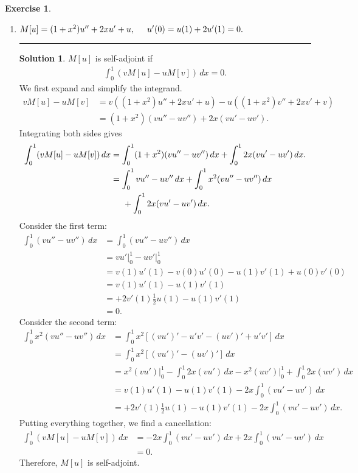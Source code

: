 \documentclass{article}
\theoremstyle{definition}
\newtheorem*{exer*}{Exercise}
\newtheorem*{sln*}{Solution}
\begin{document}
\begin{exer*}
\begin{enumerate}
		
		\item $M[u] = (1+x^2)u'' + 2xu' + u,\hspace{0.5cm} u'(0) = u(1) + 2u'(1) = 0.$\\
			\noindent\rule{\textwidth}{0.5pt}
		\begin{sln*}
		$M[u]$ is self-adjoint if
		\begin{align*}
		\int^1_0 (vM[u] - uM[v])\,dx = 0.
		\end{align*}
		We first expand and simplify the integrand.
		\begin{align*}
		vM[u] - uM[v] &= v((1+x^2)u'' + 2xu' + u) - u((1+x^2)v'' + 2xv' + v)\\
		&= (1+x^2)(vu'' - uv'') + 2x(vu' - uv').
		\end{align*} 
		Integrating both sides gives
		\begin{align*}
		\int^1_0 (vM[u] - uM[v])\,dx &= \int^1_0 (1+x^2)(vu'' - uv'')\,dx + \int^1_0 2x(vu' - uv')\,dx.\\
		&=\int^1_0 vu'' - uv''\,dx + \int^1_0 x^2(vu'' - uv'')\,dx\\
		&\hspace{0.5cm} + \int^1_0 2x(vu' - uv')\,dx.
		\end{align*}
		Consider the first term:
		\begin{align*}
		\int^1_0 (vu'' - uv'')\,dx &= \int^1_0 (vu'' - uv'')\,dx\\
		&= vu'\bigg\vert^1_0 - uv'\bigg\vert^1_0\\
		&= v(1)u'(1) - v(0)u'(0) - u(1)v'(1) + u(0)v'(0)\\
		&= v(1)u'(1) - u(1)v'(1)\\
		&= +2v'(1)\frac{1}{2}u(1) - u(1)v'(1)\\
		&= 0.
		\end{align*}
		Consider the second term:
		\begin{align*}
		\int^1_0 x^2(vu'' - uv'')\,dx &= \int^1_0 x^2 \left[ (vu')' - u'v' - (uv')' + u'v'  \right]\,dx\\
		&= \int^1_0 x^2\left[ (vu')' - (uv')' \right]\,dx\\
		&= x^2(vu')\bigg\vert^1_0 - \int^1_0 2x(vu')\,dx - x^2(uv')\bigg\vert^1_0 + \int^1_0 2x(uv')\,dx\\
		&= v(1)u'(1) - u(1)v'(1) - 2x\int^1_0 (vu' - uv')\,dx\\
		&= +2v'(1)\frac{1}{2}u(1) - u(1)v'(1) - 2x\int^1_0 (vu' - uv')\,dx.
		\end{align*} 
		Putting everything together, we find a cancellation:
		\begin{align*}
		\int^1_0 (vM[u] - uM[v])\,dx &= - 2x\int^1_0 (vu' - uv')\,dx + 2x\int^1_0 (vu' - uv')\,dx\\
		&= 0.
		\end{align*} 
		Therefore, $M[u]$ is self-adjoint. 
	




\end{sln*}
\end{enumerate}
\end{exer*}
\end{document}
